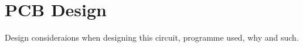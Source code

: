 \section{PCB Design}
Design consideraions when designing this circuit, programme used, why and such.
